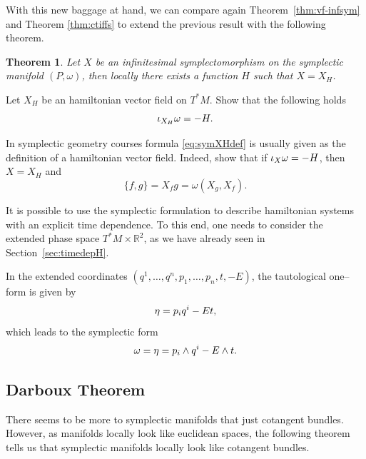 \documentclass[english,fontsize=11pt,paper=a5,oneside]{scrbook}
\newcommand{\R}{\mathbb{R}}
\let\d\relax
\DeclareMathOperator{\d}{d}
\newtheorem{theorem}{Theorem}[chapter]
\theoremstyle{definition}
\newenvironment{example}
  {\pushQED{\qed}\renewcommand{\qedsymbol}{$\lozenge$}\examplex}
  {\popQED\endexamplex}
\newenvironment{exercise}
  {\pushQED{\qed}\renewcommand{\qedsymbol}{$\maltese$}\exercisex}
  {\popQED\endexercisex}
\begin{document}
With this new baggage at hand, we can compare again Theorem~\ref{thm:vf-infsym} and Theorem \ref{thm:ctiffs} to extend the previous result with the following theorem.

\begin{theorem}
    Let $X$ be an infinitesimal symplectomorphism on the symplectic manifold $(P,\omega)$, then locally there exists a function $H$ such that $X = X_H$.
\end{theorem}

\begin{exercise}
    Let $X_H$ be an hamiltonian vector field on $T^*M$.
    Show that the following holds
    \begin{equation}\label{eq:symXHdef}
        \iota_{X_H}\omega = -\d H.
    \end{equation}

    In symplectic geometry courses formula \eqref{eq:symXHdef} is usually given as the definition of a hamiltonian vector field.
    Indeed, show that if $\iota_{X}\omega = -\d H$, then $X=X_H$ and
    \begin{equation}
        \{f,g\} = X_f g = \omega(X_g, X_f).
    \end{equation}
\end{exercise}

\begin{example}[Time dependent hamiltonians]\label{ex:timedepH}
    It is possible to use the symplectic formulation to describe hamiltonian systems with an explicit time dependence.
    To this end, one needs to consider the extended phase space $T^*M\times\R^2$, as we have already seen in Section~\ref{sec:timedepH}.

    In the extended coordinates $(q^1, \ldots, q^n, p_1,\ldots,p_n,t,-E)$, the tautological one--form is given by
    \begin{equation}
        \eta = p_i\d q^i -E\d t,
    \end{equation}
    which leads to the symplectic form
    \begin{equation}
        \omega = \d\eta = \d p_i \wedge \d q^i -\d E \wedge \d t.
    \end{equation}
\end{example}

\subsection{Darboux Theorem}

There seems to be more to symplectic manifolds that just cotangent bundles.
However, as manifolds locally look like euclidean spaces, the following theorem tells us that symplectic manifolds locally look like cotangent bundles.
\end{document}
